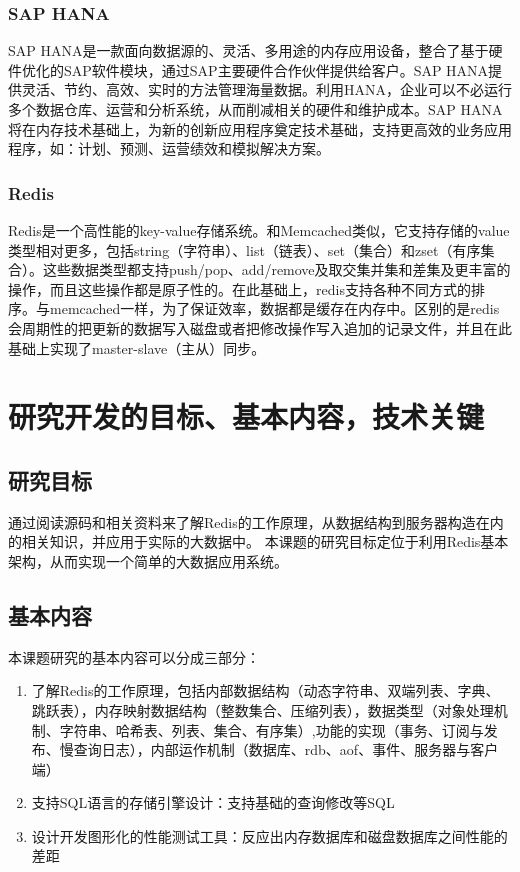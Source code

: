 \documentclass[proposal]{zjutreport}
\begin{document}
\subsection{SAP HANA}
SAP HANA\cite{ref:6}是一款面向数据源的、灵活、多用途的内存应用设备，整合了基于硬件优化的SAP软件模块，通过SAP主要硬件合作伙伴提供给客户。SAP HANA提供灵活、节约、高效、实时的方法管理海量数据。利用HANA，企业可以不必运行多个数据仓库、运营和分析系统，从而削减相关的硬件和维护成本。SAP HANA将在内存技术基础上，为新的创新应用程序奠定技术基础，支持更高效的业务应用程序，如：计划、预测、运营绩效和模拟解决方案。

\subsection{Redis}
Redis\cite{ref:7}是一个高性能的key-value存储系统。和Memcached\cite{ref:8}类似，它支持存储的value类型相对更多，包括string（字符串）、list（链表）、set（集合）和zset（有序集合）。这些数据类型都支持push/pop、add/remove及取交集并集和差集及更丰富的操作，而且这些操作都是原子性的。在此基础上，redis支持各种不同方式的排序。与memcached一样，为了保证效率，数据都是缓存在内存中。区别的是redis会周期性的把更新的数据写入磁盘或者把修改操作写入追加的记录文件，并且在此基础上实现了master-slave（主从）同步。

\chapter{研究开发的目标、基本内容，技术关键}
\section{研究目标}
通过阅读源码和相关资料来了解Redis的工作原理，从数据结构到服务器构造在内的相关知识，并应用于实际的大数据中。
本课题的研究目标定位于利用Redis基本架构，从而实现一个简单的大数据应用系统。

\section{基本内容}
本课题研究的基本内容可以分成三部分：
\begin{enumerate}[label=（\arabic*）]
\item{了解Redis的工作原理，包括内部数据结构（动态字符串、双端列表、字典\cite{ref:9}、跳跃表），内存映射数据结构（整数集合、压缩列表），数据类型（对象处理机制、字符串、哈希表、列表、集合、有序集）,功能的实现（事务、订阅与发布、慢查询日志），内部运作机制（数据库、rdb、aof、事件、服务器与客户端）
}
\item{支持SQL语言的存储引擎设计：支持基础的查询修改等SQL}
\item{设计开发图形化\cite{ref:10}的性能测试工具：反应出内存数据库和磁盘数据库之间性能的差距}
\end{enumerate}
\end{document}
